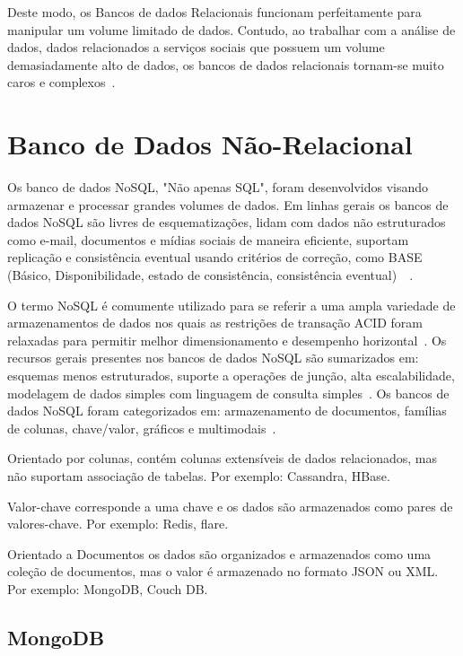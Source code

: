 \documentclass[a4paper,12pt,onecolumn,titlepage]{article}
\begin{document}
Deste modo, os Bancos de dados Relacionais funcionam perfeitamente para manipular um volume limitado de dados. Contudo, ao trabalhar com a análise de dados, dados relacionados a serviços sociais que possuem um volume demasiadamente alto de dados, os bancos de dados relacionais tornam-se muito caros e complexos~\citep{ramesh:2016}.

\section{Banco de Dados Não-Relacional}
\label{sec:nao-relacional}

Os banco de dados NoSQL, "Não apenas SQL", foram desenvolvidos visando armazenar e processar grandes volumes de dados. Em linhas gerais os bancos de dados NoSQL são livres de esquematizações, lidam com dados não estruturados como e-mail, documentos e mídias sociais de maneira eficiente, suportam replicação e consistência eventual usando critérios de correção, como BASE (Básico, Disponibilidade, estado de consistência, consistência eventual)~\citep{mohamed:2014}~\citep{ramesh:2016}.

O termo NoSQL é comumente utilizado para se referir a uma ampla variedade de armazenamentos de dados nos quais as restrições de transação ACID foram relaxadas para permitir melhor dimensionamento e desempenho horizontal~\citep{rafique:2018}. Os recursos gerais presentes nos bancos de dados NoSQL são sumarizados em: esquemas menos estruturados, suporte a operações de junção, alta escalabilidade, modelagem de dados simples com linguagem de consulta simples~\citep{ramesh:2016}. Os bancos de dados NoSQL foram categorizados em: armazenamento de documentos, famílias de colunas, chave/valor, gráficos e multimodais~\citep{aparicio:2016}.

Orientado por colunas, contém colunas extensíveis de dados relacionados, mas não suportam associação de tabelas. Por exemplo: Cassandra, HBase.

Valor-chave corresponde a uma chave e os dados são armazenados como pares de valores-chave. Por exemplo: Redis, flare.

Orientado a Documentos os dados são organizados e armazenados como uma coleção de documentos, mas o valor é armazenado no formato JSON ou XML. Por exemplo: MongoDB, Couch DB.

\subsection{MongoDB}
\label{subsec:mongo}
\end{document}
